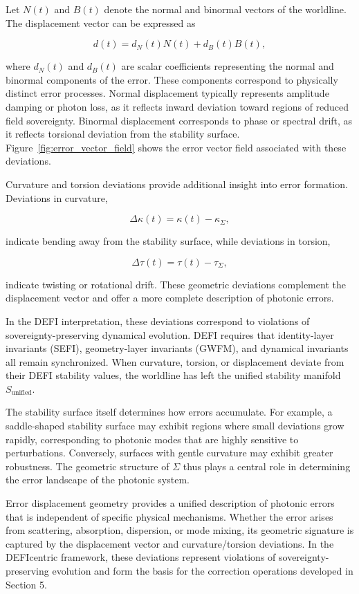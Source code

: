 \documentclass[aip,adv,reprint,floatfix]{revtex4-2}
\begin{document}
Let $N(t)$ and $B(t)$ denote the normal and binormal
vectors of the worldline. The displacement vector can be
expressed as


\[
d(t) = d_{N}(t) N(t) + d_{B}(t) B(t),
\]


where $d_{N}(t)$ and $d_{B}(t)$ are scalar coefficients representing the normal and binormal components of the error.\cite{DuttonElectronField2026}
These components correspond to physically distinct error processes. Normal displacement typically represents
amplitude damping or photon loss, as it reflects inward
deviation toward regions of reduced field sovereignty. Binormal displacement corresponds to phase or spectral
drift, as it reflects torsional deviation from the stability
surface. Figure~\ref{fig:error_vector_field} shows the error vector field
associated with these deviations.

Curvature and torsion deviations provide additional insight into error formation. Deviations in curvature,


\[
\Delta\kappa(t) = \kappa(t) - \kappa_{\Sigma},
\]


indicate bending away from the stability surface, while
deviations in torsion,


\[
\Delta\tau(t) = \tau(t) - \tau_{\Sigma},
\]


indicate twisting or rotational drift.\cite{DuttonElectronField2026}
These geometric deviations complement the displacement vector and offer a
more complete description of photonic errors.

In the DEFI interpretation, these deviations correspond to violations of sovereignty-preserving dynamical
evolution.\cite{DuttonSEFI2026} DEFI requires that identity-layer invariants
(SEFI), geometry-layer invariants (GWFM), and dynamical invariants all remain synchronized. When curvature,
torsion, or displacement deviate from their DEFI stability values, the worldline has left the unified stability
manifold $S_{\mathrm{unified}}$.

The stability surface itself determines how errors accumulate. For example, a saddle-shaped stability surface
may exhibit regions where small deviations grow rapidly,
corresponding to photonic modes that are highly sensitive to perturbations. Conversely, surfaces with gentle
curvature may exhibit greater robustness.\cite{DuttonElectronField2026}
The geometric structure of $\Sigma$ thus plays a central role in determining
the error landscape of the photonic system.

Error displacement geometry provides a unified description of photonic errors that is independent of specific physical mechanisms.\cite{DuttonElectronField2026}
Whether the error arises
from scattering, absorption, dispersion, or mode mixing,
its geometric signature is captured by the displacement
vector and curvature/torsion deviations. In the DEFIcentric framework, these deviations represent violations
of sovereignty-preserving evolution and form the basis for
the correction operations developed in Section 5.
\end{document}
